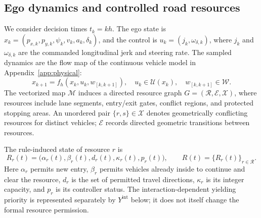 \documentclass[letterpaper]{article} %
\begin{document}
\subsection{Ego dynamics and controlled road resources}
We consider decision times $t_k=kh$. The ego state is
$x_k=(p_{x,k},p_{y,k},\psi_k,v_k,a_k,\delta_k)$, and the control is
$u_k=(j_k,\omega_{\delta,k})$, where $j_k$ and $\omega_{\delta,k}$
are the commanded longitudinal jerk and steering rate. The sampled dynamics
are the flow map of the continuous vehicle model in Appendix~\ref{app:physical}:
\begin{equation}
 x_{k+1}=f_h(x_k,u_k,w_{[k,k+1]}),\quad
 u_k\in\mathcal U(x_k),\quad w_{[k,k+1]}\in\mathcal W .
 \label{eq:disc-dyn}
\end{equation}
The vectorized map $\mathcal M$ induces a directed resource graph
$G=(\mathcal R,\mathcal E,\mathcal X)$, where resources include lane
segments, entry/exit gates, conflict regions, and protected stopping areas.
An unordered pair $\{r,s\}\in\mathcal X$ denotes geometrically conflicting
resources for distinct vehicles; $\mathcal E$ records directed geometric
transitions between resources.

The rule-induced state of resource $r$ is
\begin{equation}
 R_r(t)=\big(\alpha_r(t),\beta_r(t),d_r(t),\kappa_r(t),p_r(t)\big),
 \qquad R(t)=\{R_r(t)\}_{r\in\mathcal R}.
 \label{eq:resource-state}
\end{equation}
Here $\alpha_r$ permits new entry, $\beta_r$ permits vehicles already inside
to continue and clear the resource, $d_r$ is the set of permitted travel
directions, $\kappa_r$ is its integer capacity, and $p_r$ is its controller
status. The interaction-dependent yielding priority is represented separately
by $Y^{\mathrm{int}}$ below; it does not itself change the formal resource
permission.
\end{document}
